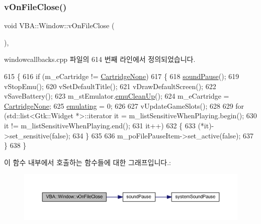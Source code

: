 \subsubsection{\texorpdfstring{v\+On\+File\+Close()}{vOnFileClose()}}
{\footnotesize\ttfamily void V\+B\+A\+::\+Window\+::v\+On\+File\+Close (\begin{DoxyParamCaption}{ }\end{DoxyParamCaption})\hspace{0.3cm}{\ttfamily [protected]}, {\ttfamily [virtual]}}



windowcallbacks.\+cpp 파일의 614 번째 라인에서 정의되었습니다.


\begin{DoxyCode}
615 \{
616   \textcolor{keywordflow}{if} (m\_eCartridge != \mbox{\hyperlink{class_v_b_a_1_1_window_af580451d3ee7a738a73434858a08fa65ab67c77301849c1cfd10bdedc74191761}{CartridgeNone}})
617   \{
618     \mbox{\hyperlink{_sound_8cpp_a0716e7957671de324eeaa4ac1729d6b7}{soundPause}}();
619     vStopEmu();
620     vSetDefaultTitle();
621     vDrawDefaultScreen();
622     vSaveBattery();
623     m\_stEmulator.\mbox{\hyperlink{struct_emulated_system_ad85b1185af3fdc35c666eb4d0eb1a431}{emuCleanUp}}();
624     m\_eCartridge = \mbox{\hyperlink{class_v_b_a_1_1_window_af580451d3ee7a738a73434858a08fa65ab67c77301849c1cfd10bdedc74191761}{CartridgeNone}};
625     \mbox{\hyperlink{gb_globals_8h_af9cc36078b1b311753963297ae7f2a74}{emulating}} = 0;
626 
627     vUpdateGameSlots();
628 
629     \textcolor{keywordflow}{for} (std::list<Gtk::Widget *>::iterator it = m\_listSensitiveWhenPlaying.begin();
630          it != m\_listSensitiveWhenPlaying.end();
631          it++)
632     \{
633       (*it)->set\_sensitive(\textcolor{keyword}{false});
634     \}
635 
636     m\_poFilePauseItem->set\_active(\textcolor{keyword}{false});
637   \}
638 \}
\end{DoxyCode}
이 함수 내부에서 호출하는 함수들에 대한 그래프입니다.\+:
\nopagebreak
\begin{figure}[H]
\begin{center}
\leavevmode
\includegraphics[width=350pt]{class_v_b_a_1_1_window_a9bb969481b9cfea3b5b5bc157ccc0ff6_cgraph}
\end{center}
\end{figure}
